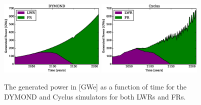 \begin{figure}[htb]
\centering
\includegraphics[width=0.45\textwidth]{gwe-dymond.eps}
\includegraphics[width=0.45\textwidth]{gwe-cyclus.eps}
\caption{The generated power in [GWe] as a function of time for the DYMOND and 
Cyclus simulators for both LWRs and FRs.}
\label{gwe-simulators}
\end{figure}
